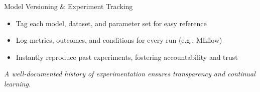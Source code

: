 \documentclass[aspectratio=169]{beamer}
\begin{document}
%
%
\begin{frame}{Model Versioning \& Experiment Tracking}
\begin{itemize}
\item Tag each model, dataset, and parameter set for easy reference
\item Log metrics, outcomes, and conditions for every run (e.g., MLflow)
\item Instantly reproduce past experiments, fostering accountability and trust
\end{itemize}

\vspace{0.8em}
\emph{A well-documented history of experimentation ensures transparency and continual learning.}

\end{frame}
\end{document}
